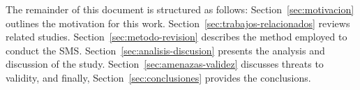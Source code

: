 The remainder of this document is structured as follows:
Section~\ref{sec:motivacion} outlines the motivation for this work.
Section~\ref{sec:trabajos-relacionados} reviews related studies.
Section~\ref{sec:metodo-revision} describes the method employed to conduct the SMS.
Section~\ref{sec:analisis-discusion} presents the analysis and discussion of the study.
Section~\ref{sec:amenazas-validez} discusses threats to validity, and finally,
Section~\ref{sec:conclusiones} provides the conclusions.